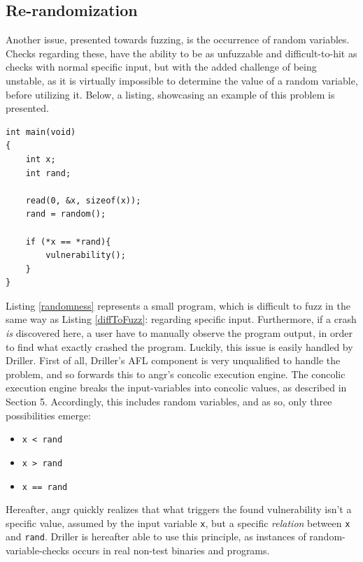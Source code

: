\documentclass[a4paper]{article}
\newcommand{\tit}[1]{\textit{#1}}
\newcommand{\ttt}[1]{\texttt{#1}}
\begin{document}
\subsection{Re-randomization}
\label{sec:randomization}
Another issue, presented towards fuzzing, is the occurrence of random variables. Checks regarding these, have the ability to be as unfuzzable and difficult-to-hit as checks with normal specific input, but with the added challenge of being unstable, as it is virtually impossible to determine the value of a random variable, before utilizing it. Below, a listing, showcasing an example of this problem is presented.
\begin{lstlisting}[caption=A program featuring randomness,
label=randomness, captionpos=b]
int main(void)
{
    int x;
    int rand;
    
    read(0, &x, sizeof(x));
    rand = random();
    
    if (*x == *rand){
        vulnerability();
    }
}
\end{lstlisting}
Listing \ref{randomness} represents a small program, which is difficult to fuzz in the same way as Listing \ref{diffToFuzz}: regarding specific input. Furthermore, if a crash \tit{is} discovered here, a user have to manually observe the program output, in order to find what exactly crashed the program.
\newpage
Luckily, this issue is easily handled by Driller. First of all, Driller's AFL component is very unqualified to handle the problem, and so forwards this to angr's concolic execution engine. The concolic execution engine breaks the input-variables into concolic values, as described in Section 5. Accordingly, this includes random variables, and as so, only three possibilities emerge:
\begin{itemize}
	\item \ttt{x < rand}
	\item \ttt{x > rand}
	\item \ttt{x == rand}
\end{itemize}
Hereafter, angr quickly realizes that what triggers the found vulnerability isn't a specific value, assumed by the input variable \ttt{x}, but a specific \tit{relation} between \ttt{x} and \ttt{rand}. Driller is hereafter able to use this principle, as instances of random-variable-checks occurs in real non-test binaries and programs.
\end{document}
